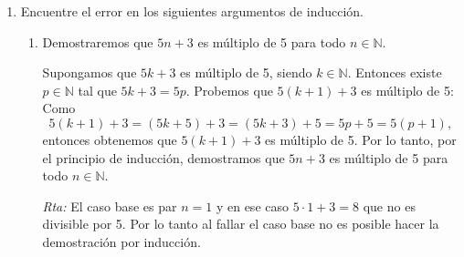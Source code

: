 \documentclass[a4paper,12pt,twoside,spanish,reqno]{amsbook}
\numberwithin{equation}{section}
\newcommand{\rta}{\noindent\textit{Rta: }}
\begin{document}
\begin{enumerate}
\begin{enumerate}
                \rta Para el caso base no falla pues $1 = 1^2$,  pero cuando queremos hacer el paso inductivo tenemos
                \begin{equation*}
                    k+1 \overset{\text{(HI)}}{=} k^2 +1 \not=(k+1)^2.
                \end{equation*}
                
                \item  $n=n+1$. No vale en el caso base: $1 \ne 1+1$.
                \item  $3^n = 3^{n+2}$.  No vale en el caso base: $3^1 = 3 \ne 27 = 3^3$.
                \item  $3^{3n} = 3^{n+2}$.  
                
                \rta La afirmación vale en el caso base pues  $3^{3\cdot 1} = 3^{1+2}$. En el paso inductivo debemos probar que si  vale $3^{3k} = 3^{k+2}$, entonces se cumple $3^{3(k+1)} = 3^{(k+1)+3}$. Sin embargo, usando  la (HI) obtenemos:
                \begin{equation*}
                3^{3(k+1)}  = 3^{3k+3} = 3^{3k}3^3\overset{\text{(HI)}}{=} 3^{k+2}3^3 = 3^{k+5}.
                \end{equation*}
                Por otro  lado $3^{(k+1)+2} = 3^{k+3}$. Deberíamos probar entonces que $3^{k+5} = 3^{k+3}$, pero esto es falso pues dividiendo  por $3^{k+3}$ obtenemos $3^2 =1$,  lo cual es absurdo.
        \end{enumerate}
        
        
        
        \item Encuentre el error en los siguientes argumentos de inducción.
        \begin{enumerate}
            \item  Demostraremos que $5n+3$ es múltiplo de 5 para todo $n\in \mathbb N$.
            
            Supongamos que $5k+3$ es múltiplo de 5, siendo $k\in \mathbb N$. Entonces existe
            $p\in \mathbb N$ tal que  $5k+3=5p$. Probemos que $5(k+1)+3$ es múltiplo de 5:
            Como
            $$
            5(k+1)+3=(5k+5)+3=(5k+3)+5=5p+5=5(p+1),
            $$
            entonces obtenemos que $5(k+1)+3$ es múltiplo de 5. Por lo tanto, por el principio
            de inducción, demostramos que $5n+3$ es múltiplo de 5 para todo $n\in \mathbb
            N$.
            
            \rta El caso base es par $n=1$ y en ese caso $5\cdot 1+3=8$ que no es divisible por 5. Por lo tanto al fallar el caso base no es posible hacer la demostración por inducción. 
            

\end{enumerate}
\end{enumerate}
\end{document}
